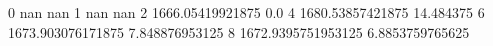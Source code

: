 0 nan nan
1 nan nan
2 1666.05419921875 0.0
4 1680.53857421875 14.484375
6 1673.903076171875 7.848876953125
8 1672.9395751953125 6.8853759765625
